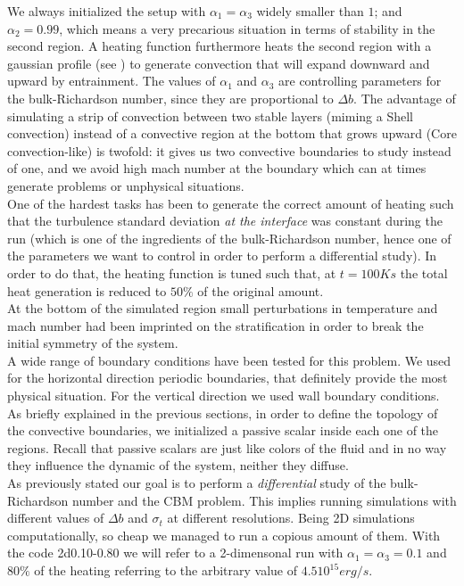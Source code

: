We always initialized the setup with $\alpha_{1} = \alpha_{3}$ widely smaller than $1$; and $\alpha_{2}=0.99$, which means a very precarious situation in terms of stability in the second region. A heating function furthermore heats the second region with a gaussian profile (see \label{fig:tempprofile}) to generate convection that will expand downward and upward by entrainment. The values of $\alpha_{1}$ and $\alpha_{3}$ are controlling parameters for the bulk-Richardson number, since they are proportional to $\Delta b$. The advantage of simulating a strip of convection between two stable layers (miming a Shell convection) instead of a convective region at the bottom that grows upward (Core convection-like) is twofold: it gives us two convective boundaries to study instead of one, and we avoid high mach number at the boundary which can at times generate problems or unphysical situations. \\
One of the hardest tasks has been to generate the correct amount of heating such that the turbulence standard deviation \textit{at the interface} was constant during the run (which is one of the ingredients of the bulk-Richardson number, hence one of the parameters we want to control in order to perform a differential study). In order to do that, the heating function is tuned such that, at $t=100K s$ the total heat generation is reduced to $50 \%$ of the original amount.\\ 
At the bottom of the simulated region small perturbations in temperature and mach number had been imprinted on the stratification in order to break the initial symmetry of the system.\\
A wide range of boundary conditions have been tested for this problem. We used for the horizontal direction periodic boundaries, that definitely provide the most physical situation. For the vertical direction we used wall boundary conditions.\\ 
As briefly explained in the previous sections, in order to define the topology of the convective boundaries, we initialized a passive scalar inside each one of the regions. Recall that passive scalars are just like colors of the fluid and in no way they influence the dynamic of the system, neither they diffuse.\\
As previously stated our goal is to perform a \textit{differential} study of the bulk-Richardson number and the CBM problem. This implies running simulations with different values of $\Delta b$ and $\sigma_t$ at different resolutions. Being 2D simulations computationally, so cheap we managed to run a copious amount of them. With the code 2d0.10-0.80 we will refer to a 2-dimensonal run with $\alpha_{1} = \alpha_{3}=0.1$ and $80 \%$ of the heating referring to the arbitrary value of $4.5 10^{15} erg/s$.\\ 
